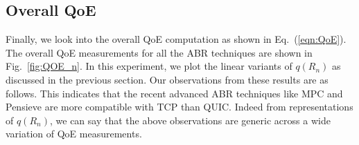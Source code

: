 
\subsection{Overall QoE}
Finally, we look into the overall QoE computation as shown in Eq.~(\ref{eqn:QoE}). The overall QoE measurements for  all the ABR techniques are shown in Fig.~\ref{fig:QOE_n}. In this experiment, we plot the linear variants of $q(R_n)$ as discussed in the previous section. Our observations from these results are as follows.  This indicates that the recent advanced ABR techniques like MPC and Pensieve are more compatible with TCP than QUIC. Indeed from representations of $q(R_n)$, we can say that the above observations are generic across a wide variation of QoE measurements. 


